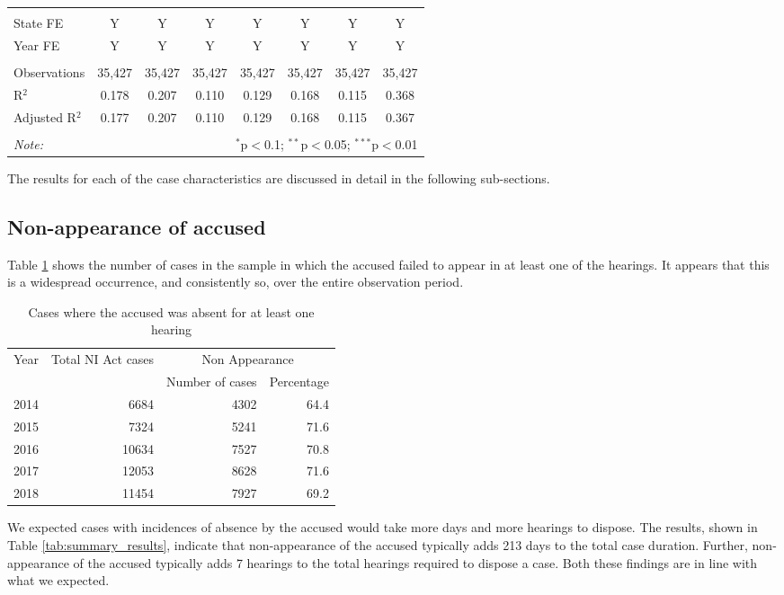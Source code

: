 {\begin{longtable}{lccccccc}
 \hline \\[-1.8ex]
 State FE & Y & Y & Y & Y & Y & Y & Y \\ 
 Year FE & Y & Y & Y & Y & Y & Y & Y \\ 
 \hline \\[-1.8ex] 
 Observations & 35,427 & 35,427 & 35,427 & 35,427 & 35,427 & 35,427 & 35,427 \\ 
 R$^{2}$ & 0.178 & 0.207 & 0.110 & 0.129 & 0.168 & 0.115 & 0.368 \\ 
 Adjusted R$^{2}$ & 0.177 & 0.207 & 0.110 & 0.129 & 0.168 & 0.115 & 0.367 \\ 
 \hline \\[-1.8ex] 
 \textit{Note:} & \multicolumn{7}{r}{$^{*}$p$<$0.1; $^{**}$p$<$0.05; $^{***}$p$<$0.01} \\ 
\end{longtable}}

The results for each of the case characteristics are discussed in detail in the following sub-sections.

\subsection{Non-appearance of accused}
\label{sec:non-appe-accus-1}

Table \ref{tab:nonAppearance_yearWise} shows the number of cases in the sample in which the accused failed to appear in at least one of the hearings. It appears that this is a widespread occurrence, and consistently so, over the entire observation period.

\begin{longtable}{@{}lrrr@{}}
 \caption{Cases where the accused was absent for at least one hearing}\label{tab:nonAppearance_yearWise}\\
\toprule
\multirow{2}{*}{Year} & \multirow{2}{*}{Total NI Act cases} & \multicolumn{2}{c}{Non Appearance}\\
\cmidrule{3-4}
&& Number of cases & Percentage \\
\midrule\endhead
2014 & 6684 & 4302 & 64.4 \\
2015 & 7324 & 5241 & 71.6 \\
2016 & 10634 & 7527 & 70.8 \\
2017 & 12053 & 8628 & 71.6 \\
2018 & 11454 & 7927 & 69.2 \\
\bottomrule
\end{longtable}

We expected cases with incidences of absence by the accused would take more days and more hearings to dispose. The results, shown in Table \ref{tab:summary_results}, indicate that non-appearance of the accused typically adds 213 days to the total case duration. Further, non-appearance of the accused typically adds 7 hearings to the total hearings required to dispose a case. Both these findings are in line with what we expected.

